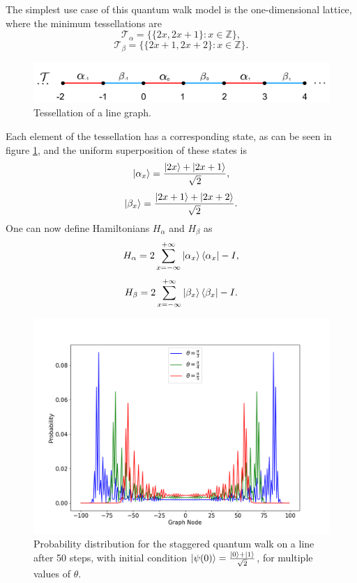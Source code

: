 \documentclass[../../dissertation.tex]{subfiles}
\begin{document}
The simplest use case of this quantum walk model is the one-dimensional
lattice, where the minimum tessellations are
\begin{equation}
	\mathscr{T}_{\alpha}= \{\{2x,2x+1\}\colon x \in \mathbb{Z}\},
\end{equation}
\begin{equation}
	\mathscr{T}_{\beta}= \{\{2x+1,2x+2\}\colon x \in \mathbb{Z}\}.
\end{equation}
\begin{figure}[!h]
	\centering
	\includegraphics[scale=0.40]{img/StagQuantumWalk/tesselation.png}
	\caption{Tessellation of a line graph.} 
	\label{fig:stagQWTesselation}
\end{figure}
Each element of the tessellation has a corresponding state, as can be seen in
figure \ref{fig:stagQWTesselation}, and the uniform superposition of these
states is
\begin{equation}
	\ket{\alpha_x} = \frac{\ket{2x} + \ket{2x+1}}{\sqrt{2}},
\end{equation}
\begin{equation}
	\ket{\beta_x} = \frac{\ket{2x+1}+\ket{2x+2}}{\sqrt{2}}.
\end{equation}
One can now define Hamiltonians $H_\alpha$ and $H_\beta$ as 
\begin{equation}
	H_\alpha = 2\sum_{x=-\infty}^{+\infty}\ket{\alpha_{x}}\bra{\alpha_x} - I,
	\label{eq:stagSimulHalpha}
\end{equation}
\begin{equation}
	H_\beta = 2\sum_{x=-\infty}^{+\infty}\ket{\beta_{x}}\bra{\beta_x} - I.
	\label{eq:stagSimulHbeta}
\end{equation}
\begin{figure}[!h]
	\centering
	\includegraphics[scale=0.40]{img/StagQuantumWalk/stagqwMultiple.png}
	\caption{Probability distribution for the staggered quantum walk on a line after 50 steps, with initial condition $\ket{\psi(0)}=\frac{\ket{0}+\ket{1}}{\sqrt{2}}$, for multiple values of $\theta$.} 
	\label{fig:stagQWSimulMultTheta}
\end{figure}\par
\end{document}

